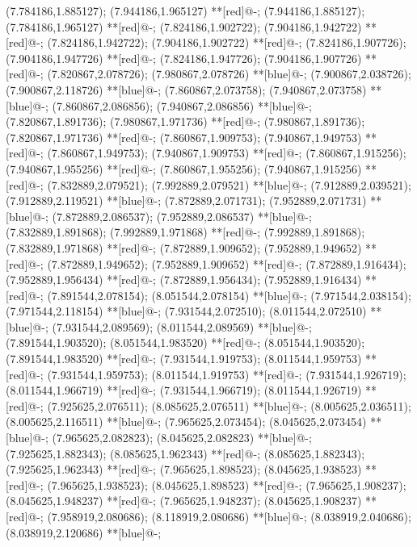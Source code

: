 (7.784186,1.885127); (7.944186,1.965127) **[red]@{-};
(7.944186,1.885127); (7.784186,1.965127) **[red]@{-};
(7.824186,1.902722); (7.904186,1.942722) **[red]@{-};
(7.824186,1.942722); (7.904186,1.902722) **[red]@{-};
(7.824186,1.907726); (7.904186,1.947726) **[red]@{-};
(7.824186,1.947726); (7.904186,1.907726) **[red]@{-};
(7.820867,2.078726); (7.980867,2.078726) **[blue]@{-};
(7.900867,2.038726); (7.900867,2.118726) **[blue]@{-};
(7.860867,2.073758); (7.940867,2.073758) **[blue]@{-};
(7.860867,2.086856); (7.940867,2.086856) **[blue]@{-};
(7.820867,1.891736); (7.980867,1.971736) **[red]@{-};
(7.980867,1.891736); (7.820867,1.971736) **[red]@{-};
(7.860867,1.909753); (7.940867,1.949753) **[red]@{-};
(7.860867,1.949753); (7.940867,1.909753) **[red]@{-};
(7.860867,1.915256); (7.940867,1.955256) **[red]@{-};
(7.860867,1.955256); (7.940867,1.915256) **[red]@{-};
(7.832889,2.079521); (7.992889,2.079521) **[blue]@{-};
(7.912889,2.039521); (7.912889,2.119521) **[blue]@{-};
(7.872889,2.071731); (7.952889,2.071731) **[blue]@{-};
(7.872889,2.086537); (7.952889,2.086537) **[blue]@{-};
(7.832889,1.891868); (7.992889,1.971868) **[red]@{-};
(7.992889,1.891868); (7.832889,1.971868) **[red]@{-};
(7.872889,1.909652); (7.952889,1.949652) **[red]@{-};
(7.872889,1.949652); (7.952889,1.909652) **[red]@{-};
(7.872889,1.916434); (7.952889,1.956434) **[red]@{-};
(7.872889,1.956434); (7.952889,1.916434) **[red]@{-};
(7.891544,2.078154); (8.051544,2.078154) **[blue]@{-};
(7.971544,2.038154); (7.971544,2.118154) **[blue]@{-};
(7.931544,2.072510); (8.011544,2.072510) **[blue]@{-};
(7.931544,2.089569); (8.011544,2.089569) **[blue]@{-};
(7.891544,1.903520); (8.051544,1.983520) **[red]@{-};
(8.051544,1.903520); (7.891544,1.983520) **[red]@{-};
(7.931544,1.919753); (8.011544,1.959753) **[red]@{-};
(7.931544,1.959753); (8.011544,1.919753) **[red]@{-};
(7.931544,1.926719); (8.011544,1.966719) **[red]@{-};
(7.931544,1.966719); (8.011544,1.926719) **[red]@{-};
(7.925625,2.076511); (8.085625,2.076511) **[blue]@{-};
(8.005625,2.036511); (8.005625,2.116511) **[blue]@{-};
(7.965625,2.073454); (8.045625,2.073454) **[blue]@{-};
(7.965625,2.082823); (8.045625,2.082823) **[blue]@{-};
(7.925625,1.882343); (8.085625,1.962343) **[red]@{-};
(8.085625,1.882343); (7.925625,1.962343) **[red]@{-};
(7.965625,1.898523); (8.045625,1.938523) **[red]@{-};
(7.965625,1.938523); (8.045625,1.898523) **[red]@{-};
(7.965625,1.908237); (8.045625,1.948237) **[red]@{-};
(7.965625,1.948237); (8.045625,1.908237) **[red]@{-};
(7.958919,2.080686); (8.118919,2.080686) **[blue]@{-};
(8.038919,2.040686); (8.038919,2.120686) **[blue]@{-};
